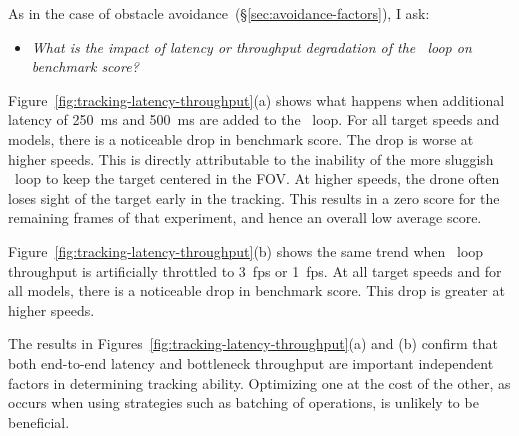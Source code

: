 As in the case of obstacle avoidance~(\S\ref{sec:avoidance-factors}),
I ask:
\begin{itemize}
\item{\em What is the impact of latency or throughput degradation of
    the \ooda~loop on benchmark score?}
\end{itemize}
Figure~\ref{fig:tracking-latency-throughput}(a) shows what happens
when additional latency of 250~ms and 500~ms are added to the
\ooda~loop.  For all target speeds and models, there is a noticeable
drop in benchmark score.  The drop is worse at higher speeds.  This is
directly attributable to the inability of the more sluggish \ooda~loop
to keep the target centered in the FOV.  At higher speeds, the drone
often loses sight of the target early in the tracking.  This results
in a zero score for the remaining frames of that experiment, and hence
an overall low average score.

Figure~\ref{fig:tracking-latency-throughput}(b) shows the same trend
when \ooda~loop throughput is artificially throttled to 3~fps or
1~fps.  At all target speeds and for all models, there is a noticeable
drop in benchmark score.  This drop is greater at higher speeds.

The results in Figures~\ref{fig:tracking-latency-throughput}(a) and
(b) confirm that both end-to-end latency and bottleneck throughput are
important independent factors in determining tracking ability.
Optimizing one at the cost of the other, as occurs when using
strategies such as batching of operations, is unlikely to be
beneficial.

